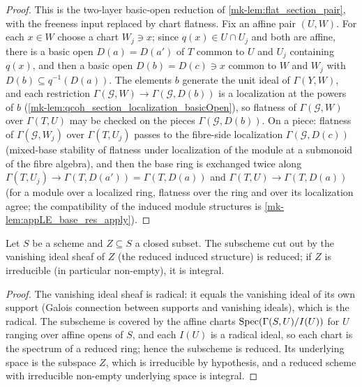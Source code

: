 \begin{proof}
  \leanok
  This is the two-layer basic-open reduction of
  \ref{mk-lem:flat_section_pair}, with the freeness input replaced by chart
  flatness.  Fix an affine pair \((U, W)\).  For each \(x \in W\) choose a
  chart \(W_j \ni x\); since \(q(x) \in U \cap U_j\) and both are affine,
  there is a basic open \(D(a) = D(a')\) of \(T\) common to \(U\) and
  \(U_j\) containing \(q(x)\), and then a basic open
  \(D(b) = D(c) \ni x\) common to \(W\) and \(W_j\) with
  \(D(b) \subseteq q^{-1}(D(a))\).  The elements \(b\) generate the unit
  ideal of \(\Gamma(Y, W)\), and each restriction
  \(\Gamma(\mathcal G, W) \to \Gamma(\mathcal G, D(b))\) is a localization at the powers of
  \(b\) (\ref{mk-lem:qcoh_section_localization_basicOpen}), so flatness of
  \(\Gamma(\mathcal G, W)\) over \(\Gamma(T, U)\) may be checked on the pieces
  \(\Gamma(\mathcal G, D(b))\).  On a piece: flatness of \(\Gamma(\mathcal G, W_j)\) over
  \(\Gamma(T, U_j)\) passes to the fibre-side localization
  \(\Gamma(\mathcal G, D(c))\) (mixed-base stability of flatness under localization
  of the module at a submonoid of the fibre algebra), and then the base ring
  is exchanged twice along
  \(\Gamma(T, U_j) \to \Gamma(T, D(a')) = \Gamma(T, D(a))\) and
  \(\Gamma(T, U) \to \Gamma(T, D(a))\) (for a module over a localized ring,
  flatness over the ring and over its localization agree; the compatibility
  of the induced module structures is \ref{mk-lem:appLE_base_res_apply}).
\end{proof}

\begin{lemma}

\label{mk-lem:vanishing_ideal_subscheme_integral}
  \leanok

  Let \(S\) be a scheme and \(Z \subseteq S\) a closed subset.  The
  subscheme cut out by the vanishing ideal sheaf of \(Z\) (the reduced
  induced structure) is reduced; if \(Z\) is irreducible (in particular
  non-empty), it is integral.
\end{lemma}

\begin{proof}
  \leanok
  The vanishing ideal sheaf is radical: it equals the vanishing ideal of
  its own support (Galois connection between supports and vanishing
  ideals), which is the radical.  The subscheme is covered by the affine
  charts \(\operatorname{Spec}(\Gamma(S, U)/I(U))\) for \(U\) ranging over affine opens
  of \(S\), and each \(I(U)\) is a radical ideal, so each chart is the
  spectrum of a reduced ring; hence the subscheme is reduced.  Its
  underlying space is the subspace \(Z\), which is irreducible by
  hypothesis, and a reduced scheme with irreducible non-empty underlying
  space is integral.
\end{proof}

